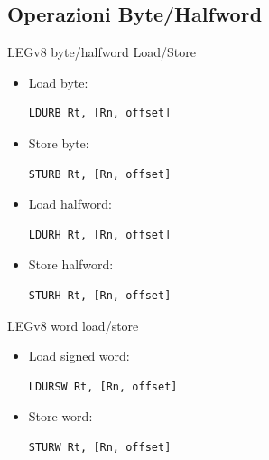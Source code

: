 \documentclass[12pt,a4paper]{article}
\begin{document}
\subsection{Operazioni Byte/Halfword}
LEGv8 byte/halfword Load/Store
\begin{itemize}
\item Load byte: 
\begin{minipage}{.2\linewidth}
\begin{verbatim}
LDURB Rt, [Rn, offset]
\end{verbatim}
\end{minipage}
\item Store byte:
\begin{minipage}{.2\linewidth}
\begin{verbatim}
STURB Rt, [Rn, offset]
\end{verbatim}
\end{minipage}
\item Load halfword:
\begin{minipage}{.2\linewidth}
\begin{verbatim}
LDURH Rt, [Rn, offset]
\end{verbatim}
\end{minipage}
\item Store halfword:
\begin{minipage}{.2\linewidth}
\begin{verbatim}
STURH Rt, [Rn, offset]
\end{verbatim}
\end{minipage}
\end{itemize}
LEGv8 word load/store
\begin{itemize}
\item Load signed word:
\begin{minipage}{.2\linewidth}
\begin{verbatim}
LDURSW Rt, [Rn, offset]
\end{verbatim}
\end{minipage}
\item Store word:
\begin{minipage}{.2\linewidth}
\begin{verbatim}
STURW Rt, [Rn, offset]
\end{verbatim}
\end{minipage}
\end{itemize}
\end{document}
